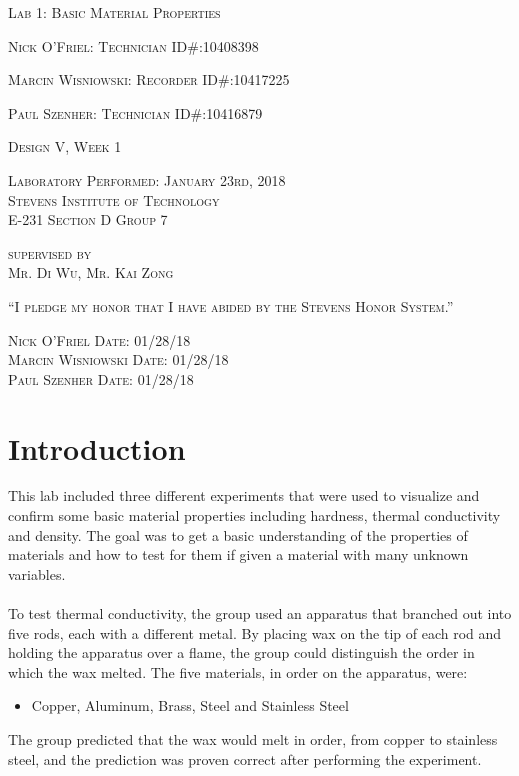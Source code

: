 \documentclass{article}
\begin{document}
\title{}
\begin{titlepage}
    \centering
	{\scshape\LARGE Lab 1: Basic Material Properties\par}
	\vspace{1cm}
	{\scshape Nick O’Friel: Technician \hfill ID\#:10408398 \par}
	{\scshape Marcin Wisniowski: Recorder \hfill ID\#:10417225\par}
	{\scshape Paul Szenher: Technician \hfill ID\#:10416879\par}
	\vfill
	{\scshape Design V, Week 1\par}
	\vspace{.5cm}
	{\scshape Laboratory Performed: January 23rd, 2018\\Stevens Institute of Technology\\E-231 Section D Group 7\par}
	\vspace{.5cm}
	{\scshape supervised by\\Mr. Di Wu, Mr. Kai Zong \par}
    \vfill
	{\scshape“I pledge my honor that I have abided by the Stevens Honor System.”\par}
	\vspace{.5cm}
	{\scshape Nick O’Friel \hfill Date: 01/28/18\\Marcin Wisniowski \hfill Date: 01/28/18\\Paul Szenher \hfill Date: 01/28/18\\}
	\vspace{3cm}
\end{titlepage}

\section{Introduction}
This lab included three different experiments that were used to visualize and confirm some basic material properties including hardness, thermal conductivity and density. The goal was to get a basic understanding of the properties of materials and how to test for them if given a material with many unknown variables. 
\paragraph{}
To test thermal conductivity, the group used an apparatus that branched out into five rods, each with a different metal. By placing wax on the tip of each rod and holding the apparatus over a flame, the group could distinguish the order in which the wax melted. The five materials, in order on the apparatus, were:
\begin{itemize}
	\item{Copper, Aluminum, Brass, Steel and Stainless Steel}
\end{itemize}
The group predicted that the wax would melt in order, from copper to stainless steel, and the prediction was proven correct after performing the experiment. 
\end{document}
